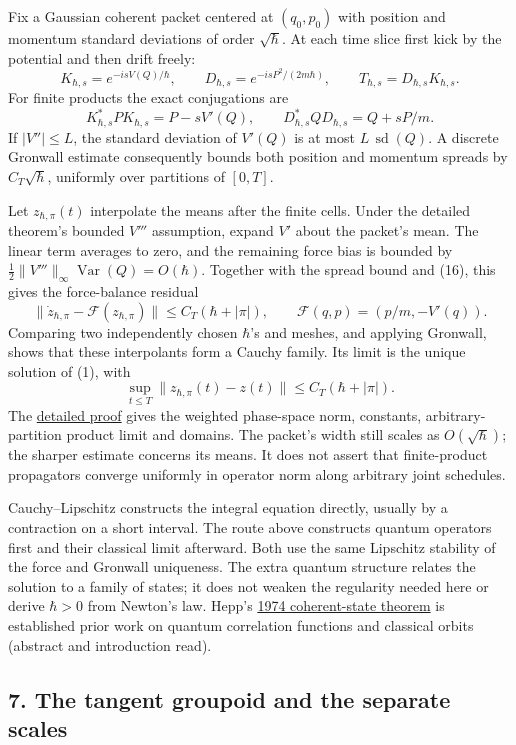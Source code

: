 \documentclass[11pt,a4paper]{article}
\begin{document}
Fix a Gaussian coherent packet centered at \((q_0,p_0)\) with position
and momentum standard deviations of order \(\sqrt\hbar\). At each time
slice first kick by the potential and then drift freely:
\[K_{\hbar,s}=e^{-isV(Q)/\hbar},\qquad
 D_{\hbar,s}=e^{-isP^2/(2m\hbar)},\qquad
 T_{\hbar,s}=D_{\hbar,s}K_{\hbar,s}.\tag{15}\] For finite products the
exact conjugations are \[K_{\hbar,s}^*PK_{\hbar,s}=P-sV'(Q),\qquad
 D_{\hbar,s}^*QD_{\hbar,s}=Q+sP/m.\tag{16}\] If \(|V''|\le L\), the
standard deviation of \(V'(Q)\) is at most \(L\,\operatorname{sd}(Q)\).
A discrete Gronwall estimate consequently bounds both position and
momentum spreads by \(C_T\sqrt\hbar\), uniformly over partitions of
\([0,T]\).

Let \(z_{\hbar,\pi}(t)\) interpolate the means after the finite cells.
Under the detailed theorem's bounded \(V'''\) assumption, expand \(V'\)
about the packet's mean. The linear term averages to zero, and the
remaining force bias is bounded by
\(\tfrac12\|V'''\|_\infty\operatorname{Var}(Q)=O(\hbar)\). Together with
the spread bound and (16), this gives the force-balance residual \[
 \|\dot z_{\hbar,\pi}-\mathcal F(z_{\hbar,\pi})\|
       \le C_T(\hbar+|\pi|),
 \qquad \mathcal F(q,p)=(p/m,-V'(q)).\tag{17}
\] Comparing two independently chosen \(\hbar\)'s and meshes, and
applying Gronwall, shows that these interpolants form a Cauchy family.
Its limit is the unique solution of (1), with
\[\sup_{t\le T}\|z_{\hbar,\pi}(t)-z(t)\|
        \le C_T(\hbar+|\pi|).\tag{18}\] The
\href{quantum-blocks-construct-newton.md}{detailed proof} gives the
weighted phase-space norm, constants, arbitrary-partition product limit
and domains. The packet's width still scales as \(O(\sqrt\hbar)\); the
sharper estimate concerns its means. It does not assert that
finite-product propagators converge uniformly in operator norm along
arbitrary joint schedules.

Cauchy--Lipschitz constructs the integral equation directly, usually by
a contraction on a short interval. The route above constructs quantum
operators first and their classical limit afterward. Both use the same
Lipschitz stability of the force and Gronwall uniqueness. The extra
quantum structure relates the solution to a family of states; it does
not weaken the regularity needed here or derive \(\hbar>0\) from
Newton's law. Hepp's \href{https://doi.org/10.1007/BF01646348}{1974
coherent-state theorem} is established prior work on quantum correlation
functions and classical orbits (abstract and introduction read).

\hypertarget{the-tangent-groupoid-and-the-separate-scales}{%
\subsection{7. The tangent groupoid and the separate
scales}\label{the-tangent-groupoid-and-the-separate-scales}}
\end{document}
